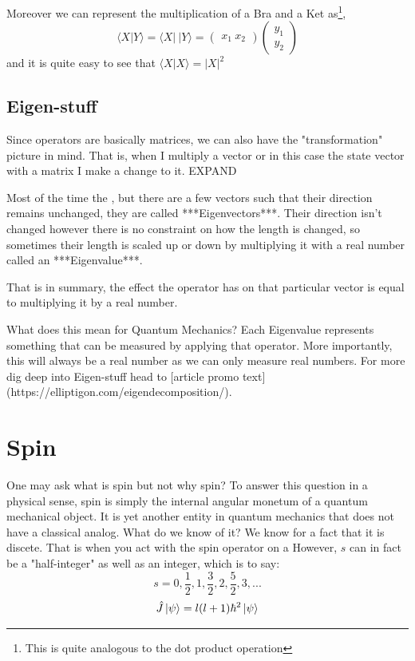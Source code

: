 \documentclass[]{article}
\begin{document}
Moreover we can represent the multiplication of a Bra and a Ket as\footnote{This is quite analogous to the dot product operation},
$$\langle X|Y \rangle = \langle X | \  |Y\rangle = \begin{pmatrix}
x_1 \ x_2
\end{pmatrix} \begin{pmatrix}
y_1 \\
y_2
\end{pmatrix}$$
and it is quite easy to see that
$\langle X | X \rangle = |X|^2$

\subsection{Eigen-stuff}

Since operators are basically matrices, we can also have the "transformation" picture in mind. That is, when I multiply a vector or in this case the state vector with a matrix I make a change to it. EXPAND

Most of the time the , but there are a few vectors such that their direction remains unchanged, they are called ***Eigenvectors***. Their direction isn't changed however there is no constraint on how the length is changed, so sometimes their length is scaled up or down by multiplying it with a real number called an ***Eigenvalue***. 


That is in summary, the effect the operator has on that particular vector is equal to multiplying it by a real number.


What does this mean for Quantum Mechanics? Each Eigenvalue represents something that can be measured by applying that operator. More importantly, this will always be a real number as we can only measure real numbers. For more dig deep into Eigen-stuff head to [article promo text](https://elliptigon.com/eigendecomposition/).

\section{Spin}
One may ask what is spin but not why spin? To answer this question in a physical sense, spin is simply the internal angular monetum of a quantum mechanical object. It is yet another entity in quantum mechanics that does not have a classical analog. What do we know of it? We know for a fact that it is discete. That is when you act with the spin operator on a 
However, $s$ can in fact be a "half-integer" as well as an integer, which is to say:
$$s = 0, \frac{1}{2}, 1, \frac{3}{2}, 2, \frac{5}{2}, 3, ...$$
$$\hat{J} \ket{\psi} = l(l+1)\hbar^{2}\ket{\psi}$$
\end{document}
